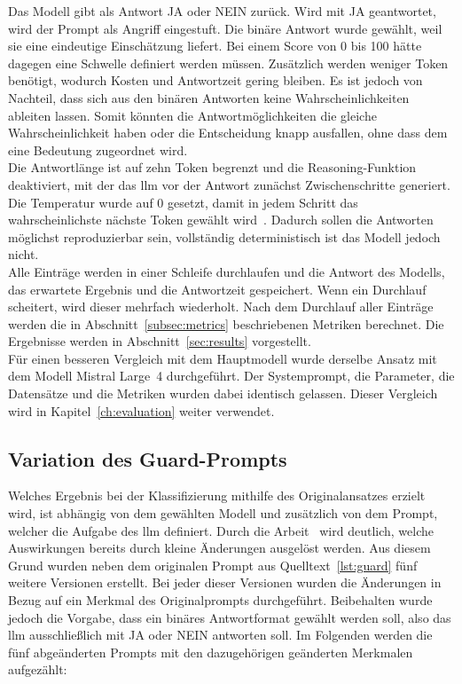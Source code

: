Das Modell gibt als Antwort JA oder NEIN zurück. Wird mit JA geantwortet, wird der Prompt als Angriff eingestuft. Die binäre Antwort wurde gewählt, weil sie
eine eindeutige Einschätzung liefert. Bei einem Score von 0 bis 100 hätte dagegen eine Schwelle definiert werden müssen. Zusätzlich werden weniger Token 
benötigt, wodurch Kosten und Antwortzeit gering bleiben. Es ist jedoch von Nachteil, dass sich aus den binären Antworten keine Wahrscheinlichkeiten ableiten lassen. 
Somit könnten die Antwortmöglichkeiten die gleiche Wahrscheinlichkeit haben oder die Entscheidung knapp ausfallen, ohne dass dem eine Bedeutung zugeordnet wird. \\
Die Antwortlänge ist auf zehn Token begrenzt und die Reasoning-Funktion deaktiviert, mit der das \ac{llm} vor der Antwort zunächst Zwischenschritte generiert.
Die Temperatur wurde auf 0 gesetzt, damit in jedem Schritt das wahrscheinlichste nächste Token gewählt wird~\cite{sm45}. 
Dadurch sollen die Antworten
möglichst reproduzierbar sein, vollständig deterministisch ist das Modell jedoch nicht. \\
Alle Einträge werden in einer Schleife durchlaufen und die Antwort des Modells, das erwartete Ergebnis und die Antwortzeit gespeichert. Wenn ein Durchlauf scheitert,
wird dieser mehrfach wiederholt. Nach dem Durchlauf aller Einträge werden die in Abschnitt~\ref{subsec:metrics} beschriebenen Metriken berechnet. Die
Ergebnisse werden in Abschnitt~\ref{sec:results} vorgestellt. \\
Für einen besseren Vergleich mit dem Hauptmodell wurde derselbe Ansatz mit dem Modell Mistral Large~4 durchgeführt. Der Systemprompt, die Parameter, die 
Datensätze und die Metriken wurden dabei identisch gelassen. Dieser Vergleich wird in Kapitel~\ref{ch:evaluation} weiter verwendet.

\subsection{Variation des Guard-Prompts}

Welches Ergebnis bei der Klassifizierung mithilfe des Originalansatzes erzielt wird, ist abhängig von dem gewählten Modell und zusätzlich von dem Prompt, welcher 
die Aufgabe des \ac{llm} definiert. Durch die Arbeit~\cite{sm46} wird deutlich, welche Auswirkungen bereits durch kleine Änderungen ausgelöst werden. Aus diesem
Grund wurden neben dem originalen Prompt aus Quelltext~\ref{lst:guard} fünf weitere Versionen erstellt. Bei jeder dieser Versionen wurden die Änderungen in Bezug auf ein Merkmal
des Originalprompts durchgeführt. Beibehalten wurde jedoch die Vorgabe, dass ein binäres Antwortformat gewählt werden soll, also das \ac{llm} ausschließlich mit 
JA oder NEIN antworten soll. Im Folgenden werden die fünf abgeänderten Prompts mit den dazugehörigen geänderten Merkmalen aufgezählt: 


